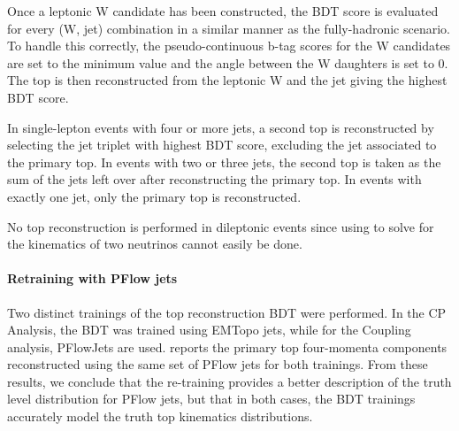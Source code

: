 Once a leptonic W candidate has been constructed, the BDT score is evaluated for every (W, jet) combination in a similar manner as the fully-hadronic scenario. To handle this correctly, the pseudo-continuous b-tag scores for the W candidates are set to the minimum value and the angle between the W daughters is set to 0. The top is then reconstructed from the leptonic W and the jet giving the highest BDT score.

In single-lepton events with four or more jets, a second top is reconstructed by selecting the jet triplet with highest BDT score, excluding the jet associated to the primary top. In events with two or three jets, the second top is taken as the sum of the jets left over after reconstructing the primary top. In events with exactly one jet, only the primary top is reconstructed.

No top reconstruction is performed in dileptonic events since using \MET to solve for the kinematics of two neutrinos cannot easily be done.

\paragraph{Retraining with PFlow jets}
Two distinct trainings of the top reconstruction BDT were performed. In the CP Analysis, the BDT was trained using EMTopo jets, while for the Coupling analysis, PFlowJets are used. \Fig{\ref{fig:sel_topReco_retrain}} reports the primary top four-momenta components reconstructed using the same set of PFlow jets for both trainings. From these results, we conclude that the re-training provides a better description of the truth level distribution for PFlow jets, but that in both cases, the BDT trainings accurately model the truth top kinematics distributions.


